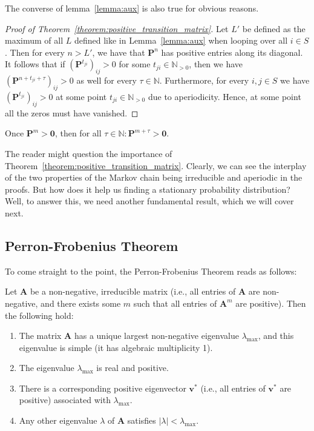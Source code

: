 \documentclass[../../main.tex]{subfiles}
\begin{document}
\begin{remark}
    The converse of lemma~\ref{lemma:aux} is also true for obvious reasons.
\end{remark}

\begin{proof}[Proof of Theorem~\ref{theorem:positive_transition_matrix}]
    Let $L'$ be defined as the maximum of all $L$ defined like in Lemma~\ref{lemma:aux} when looping over all $i \in S$. Then for every $n > L'$, we have that $\bm{P}^n$ has positive entries along its diagonal. It follows that if $(\bm{P}^{t_{ji}})_{ij} > 0$ for some $t_{ji} \in \mathbb{N}_{>0}$, then we have $(\bm{P}^{n + t_{ji} + \tau})_{ij} > 0$ as well for every $\tau \in \mathbb{N}$. Furthermore, for every $i,j \in S$ we have $(\bm{P}^{t_{ji}})_{ij} > 0$ at some point $t_{ji} \in \mathbb{N}_{>0}$ due to aperiodicity. Hence, at some point all the zeros must have vanished.
\end{proof}

\begin{corollary}
    Once $\bm{P}^m > \bm{0}$, then for all $\tau \in \mathbb{N}: \bm{P}^{m + \tau} > \bm{0}$. 
\end{corollary}

The reader might question the importance of Theorem~\ref{theorem:positive_transition_matrix}. Clearly, we can see the interplay of the two properties of the Markov chain being irreducible and aperiodic in the proofs. But how does it help us finding a stationary probability distribution? Well, to answer this, we need another fundamental result, which we will cover next.


\subsection{Perron-Frobenius Theorem}
To come straight to the point, the Perron-Frobenius Theorem reads as follows:

\begin{theorem}
    \label{theorem:perron_frobenius}
    Let \( \bm{A} \) be a non-negative, irreducible matrix (i.e., all entries of \( \bm{A} \) are non-negative, and there exists some \( m \) such that all entries of \( \bm{A}^m \) are positive). Then the following hold:

    \begin{enumerate}
        \item The matrix \( \bm{A} \) has a unique largest non-negative eigenvalue \( \lambda_{\max} \), and this eigenvalue is simple (it has algebraic multiplicity 1).
        \item The eigenvalue \( \lambda_{\max} \) is real and positive.
        \item There is a corresponding positive eigenvector \( \bm{v}^* \) (i.e., all entries of \( \bm{v}^* \) are positive) associated with \( \lambda_{\max} \).
        \item Any other eigenvalue \( \lambda \) of \( \bm{A} \) satisfies \( |\lambda| < \lambda_{\max} \).
    \end{enumerate}
\end{theorem}
\end{document}
